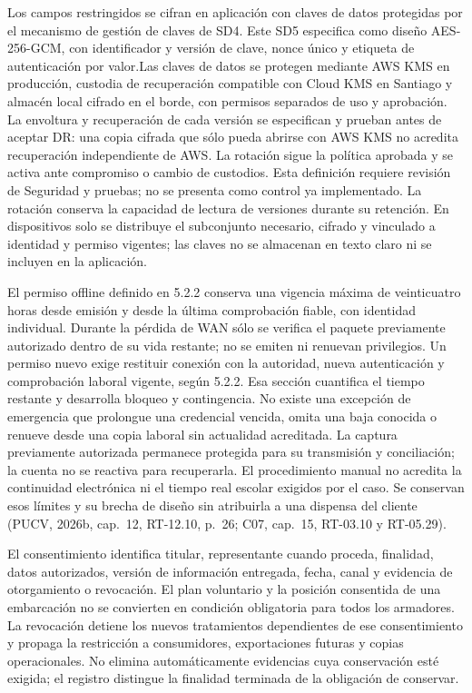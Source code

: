Los campos restringidos se cifran en aplicación con claves de datos protegidas por el mecanismo de gestión de claves de SD4. Este SD5 especifica como diseño AES-256-GCM, con identificador y versión de clave, nonce único y etiqueta de autenticación por valor.Las claves de datos se protegen mediante AWS KMS en producción, custodia de recuperación compatible con Cloud KMS en Santiago y almacén local cifrado en el borde, con permisos separados de uso y aprobación. La envoltura y recuperación de cada versión se especifican y prueban antes de aceptar DR: una copia cifrada que sólo pueda abrirse con AWS KMS no acredita recuperación independiente de AWS. La rotación sigue la política aprobada y se activa ante compromiso o cambio de custodios. Esta definición requiere revisión de Seguridad y pruebas; no se presenta como control ya implementado. La rotación conserva la capacidad de lectura de versiones durante su retención. En dispositivos solo se distribuye el subconjunto necesario, cifrado y vinculado a identidad y permiso vigentes; las claves no se almacenan en texto claro ni se incluyen en la aplicación.

 El permiso offline definido en 5.2.2 conserva una vigencia máxima de veinticuatro horas desde emisión y desde la última comprobación fiable, con identidad individual. Durante la pérdida de WAN sólo se verifica el paquete previamente autorizado dentro de su vida restante; no se emiten ni renuevan privilegios. Un permiso nuevo exige restituir conexión con la autoridad, nueva autenticación y comprobación laboral vigente, según 5.2.2. Esa sección cuantifica el tiempo restante y desarrolla bloqueo y contingencia. No existe una excepción de emergencia que prolongue una credencial vencida, omita una baja conocida o renueve desde una copia laboral sin actualidad acreditada. La captura previamente autorizada permanece protegida para su transmisión y conciliación; la cuenta no se reactiva para recuperarla. El procedimiento manual no acredita la continuidad electrónica ni el tiempo real escolar exigidos por el caso. Se conservan esos límites y su brecha de diseño sin atribuirla a una dispensa del cliente (PUCV, 2026b, cap.~12, RT-12.10, p.~26; C07, cap.~15, RT-03.10 y RT-05.29).

El consentimiento identifica titular, representante cuando proceda, finalidad, datos autorizados, versión de información entregada, fecha, canal y evidencia de otorgamiento o revocación. El plan voluntario y la posición consentida de una embarcación no se convierten en condición obligatoria para todos los armadores. La revocación detiene los nuevos tratamientos dependientes de ese consentimiento y propaga la restricción a consumidores, exportaciones futuras y copias operacionales. No elimina automáticamente evidencias cuya conservación esté exigida; el registro distingue la finalidad terminada de la obligación de conservar.

